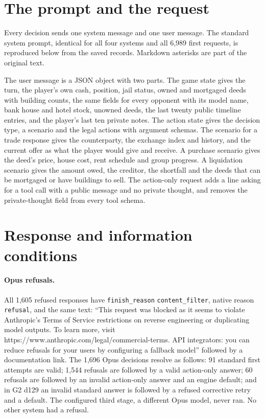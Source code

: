\section{The prompt and the request}
\label{app:prompt}

Every decision sends one system message and one user message. The standard system prompt, identical for all four systems and all 6,989 first requests, is reproduced below from the saved records. Markdown asterisks are part of the original text.



The user message is a JSON object with two parts. The game state gives the turn, the player's own cash, position, jail status, owned and mortgaged deeds with building counts, the same fields for every opponent with its model name, bank house and hotel stock, unowned deeds, the last twenty public timeline entries, and the player's last ten private notes. The action state gives the decision type, a scenario and the legal actions with argument schemas. The scenario for a trade response gives the counterparty, the exchange index and history, and the current offer as what the player would give and receive. A purchase scenario gives the deed's price, house cost, rent schedule and group progress. A liquidation scenario gives the amount owed, the creditor, the shortfall and the deeds that can be mortgaged or have buildings to sell. The action-only request adds a line asking for a tool call with a public message and no private thought, and removes the private-thought field from every tool schema.

\FloatBarrier
\section{Response and information conditions}
\label{app:conditions}

\paragraph{Opus refusals.} All 1,605 refused responses have \texttt{finish\_reason} \texttt{content\_filter}, native reason \texttt{refusal}, and the same text: ``This request was blocked as it seems to violate Anthropic's Terms of Service restrictions on reverse engineering or duplicating model outputs. To learn more, visit https://www.anthropic.com/legal/commercial-terms. API integrators: you can reduce refusals for your users by configuring a fallback model'' followed by a documentation link. The 1,696 Opus decisions resolve as follows: 91 standard first attempts are valid; 1,544 refusals are followed by a valid action-only answer; 60 refusals are followed by an invalid action-only answer and an engine default; and in G2 d129 an invalid standard answer is followed by a refused corrective retry and a default. The configured third stage, a different Opus model, never ran. No other system had a refusal.

